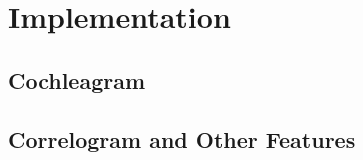 \chapter{Implementation}\label{chapter:implementation}



\section{Cochleagram}
\section{Correlogram and Other Features}
